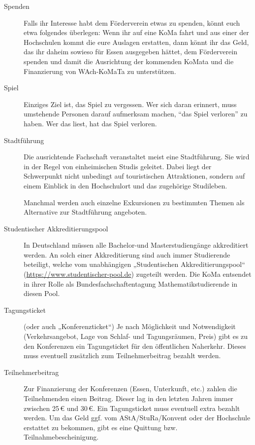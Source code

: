 \begin{description}
\item[Spenden]
    Falls ihr Interesse habt dem Förderverein etwas zu spenden, könnt euch etwa folgendes         überlegen: Wenn ihr auf eine KoMa fahrt und	aus einer der Hochschulen kommt die eure Auslagen erstatten, dann könnt ihr das Geld, das ihr daheim sowieso für Essen ausgegeben hättet, dem Förderverein spenden und damit die Ausrichtung der kommenden KoMata und die Finanzierung von WAch-KoMaTa zu unterstützen.

\item[Spiel]
    Einziges Ziel ist, das Spiel zu vergessen. Wer sich daran erinnert, muss umstehende Personen darauf aufmerksam machen, \enquote{das Spiel verloren} zu haben. Wer das liest, hat das Spiel verloren.

\item[Stadtführung]
    Die ausrichtende Fachschaft veranstaltet meist eine Stadtführung. Sie wird in der Regel von einheimischen Studis geleitet. Dabei liegt der Schwerpunkt nicht unbedingt auf touristischen Attraktionen, sondern auf einem Einblick in den Hochschulort und das zugehörige Studileben.
    
    Manchmal werden auch einzelne Exkursionen zu bestimmten Themen als Alternative zur Stadtführung angeboten.

\item[Studentischer Akkreditierungspool]\label{itm:pool}
    In Deutschland müssen alle Bachelor-und Masterstudiengänge akkreditiert werden. An solch einer Akkreditierung sind auch immer Studierende beteiligt, welche vom unabhängigen „Studentischen Akkreditierungspool“ (\url{https://www.studentischer-pool.de}) zugeteilt werden. Die KoMa entsendet in ihrer Rolle als Bundesfachschaftentagung Mathematikstudierende in diesen Pool.

\item[Tagungsticket]
    (oder auch „Konferenzticket“) Je nach Möglichkeit und Notwendigkeit (Verkehrsangebot, Lage von Schlaf- und Tagungsräumen, Preis) gibt es zu den Konferenzen ein Tagungsticket für den öffentlichen Naherkehr. Dieses muss eventuell zusätzlich zum Teilnehmerbeitrag bezahlt werden.

\item[Teilnehmerbeitrag]
    Zur Finanzierung der Konferenzen (Essen, Unterkunft, etc.) zahlen die Teilnehmenden einen Beitrag. Dieser lag in den letzten Jahren immer zwischen 25\,€ und 30\,€. Ein Tagungsticket muss eventuell extra bezahlt werden. Um das Geld ggf. vom AStA/StuRa/Konvent oder der Hochschule erstattet zu bekommen, gibt es eine Quittung bzw. Teilnahmebescheinigung.


\end{description}
